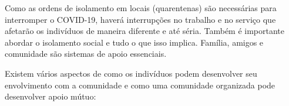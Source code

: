 \documentclass[onecolumn,journal]{IEEEtran}
\begin{document}


\begin{multicols}{2}

Como as ordens de isolamento em locais (quarentenas) são necessárias para interromper o COVID-19, haverá interrupções no trabalho e no serviço que afetarão os indivíduos de maneira diferente e até séria. Também é importante abordar o isolamento social e tudo o que isso implica. Família, amigos e comunidade são sistemas de apoio essenciais.

Existem vários aspectos de como os indivíduos podem desenvolver seu envolvimento com a comunidade e como uma comunidade organizada pode desenvolver apoio mútuo:


\end{multicols}
\end{document}
